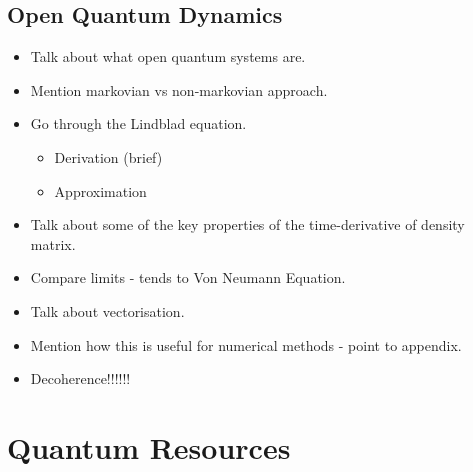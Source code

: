 \documentclass[12pt]{article}
\begin{document}
\subsection{Open Quantum Dynamics} \label{OQS_Theory}
\begin{itemize}
    \item Talk about what open quantum systems are. 
    \item Mention markovian vs non-markovian approach. 
    \item Go through the Lindblad equation.
    \begin{itemize}
        \item Derivation (brief)
        \item Approximation
    \end{itemize}
    \item Talk about some of the key properties of the time-derivative of density matrix. 
    \item Compare limits - tends to Von Neumann Equation. 
    \item Talk about vectorisation. 
    \item Mention how this is useful for numerical methods - point to appendix. 
    \item Decoherence!!!!!!
\end{itemize}













































\newpage
\section{Quantum Resources}
\end{document}
